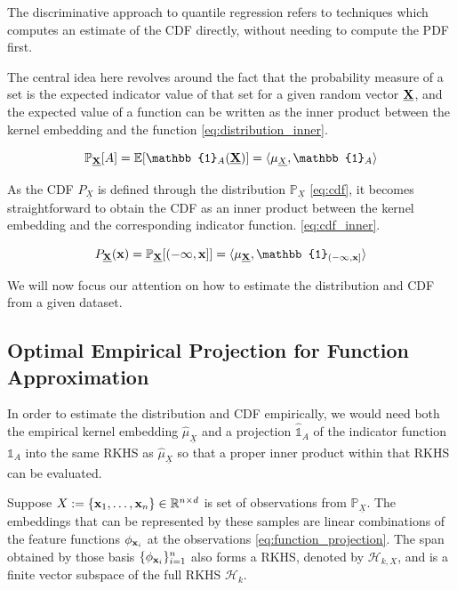 \documentclass[twoside]{article} \usepackage{aistats2017}
\theoremstyle{definition}
\theoremstyle{remark}
\newcommand{\rv}[1]{\underline{#1}}
\newcommand{\ds}[1]{{#1}}
\begin{document}
	The discriminative approach to quantile regression refers to techniques which computes an estimate of the CDF directly, without needing to compute the PDF first.
	
	The central idea here revolves around the fact that the probability measure of a set is the expected indicator value of that set for a given random vector $\bvec{\rv{X}}$, and the expected value of a function can be written as the inner product between the kernel embedding and the function \eqref{eq:distribution_inner}.
	
	\begin{equation}
		\mathbb{P}_{\bvec{\rv{X}}}[A] = \mathbb{E}[\mathbb{1}_{A}(\bvec{\rv{X}})] = \langle \mu_{\rv{X}}, \mathbb{1}_{A} \rangle
	\label{eq:distribution_inner}
	\end{equation}
	
	As the CDF $P_{\rv{X}}$ is defined through the distribution $\mathbb{P}_{\rv{X}}$ \eqref{eq:cdf}, it becomes straightforward to obtain the CDF as an inner product between the kernel embedding and the corresponding indicator function. \eqref{eq:cdf_inner}.
	
	\begin{equation}
		P_{\bvec{\rv{X}}}(\bvec{x}) = \mathbb{P}_{\bvec{\rv{X}}}[(-\bvec{\infty}, \bvec{x}]] = \langle \mu_{\bvec{\rv{X}}}, \mathbb{1}_{(-\bvec{\infty}, \bvec{x}]} \rangle
	\label{eq:cdf_inner}
	\end{equation}
	
	We will now focus our attention on how to estimate the distribution and CDF from a given dataset.
	
	\subsection{Optimal Empirical Projection for Function Approximation}
	\label{sec:discriminative_quantile_regression:optimal_function_approximation}
	
		In order to estimate the distribution and CDF empirically, we would need both the empirical kernel embedding $\hat{\mu}_{\rv{X}}$ and a projection $\hat{\mathbb{1}}_{A}$ of the indicator function $\mathbb{1}_{A}$ into the same RKHS as $\hat{\mu}_{\rv{X}}$ so that a proper inner product within that RKHS can be evaluated.

		Suppose $\ds{X} := \{\bvec{x}_{1}, \dots, \bvec{x}_{n}\} \in \mathbb{R}^{n \times d}$ is set of observations from $\mathbb{P}_{\rv{X}}$. The embeddings that can be represented by these samples are linear combinations of the feature functions $\phi_{\mathbf{x}_{i}}$ at the observations \eqref{eq:function_projection}. The span obtained by those basis $\{\phi_{\mathbf{x}_{i}}\}_{i = 1}^{n}$ also forms a RKHS, denoted by $\mathcal{H}_{k, \ds{X}}$, and is a finite vector subspace of the full RKHS $\mathcal{H}_{k}$.
		
\end{document}
